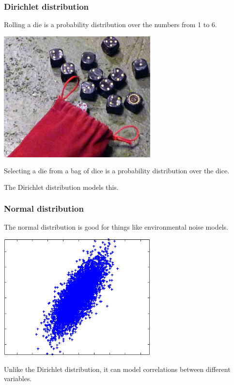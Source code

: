 \begin{frame}
  \frametitle{Dirichlet distribution}
  \begin{center}
    Rolling a die is a probability distribution over the numbers from 1 to 6.

    \includegraphics[width=0.6\textwidth]{img/dice2-cropped.jpg}

    Selecting a die from a bag of dice is a probability distribution over the dice.

    The Dirichlet distribution models this.
  \end{center}
\end{frame}

\begin{frame}
  \frametitle{Normal distribution}
  \begin{center}
    The normal distribution is good for things like environmental noise models.

    \includegraphics[width=0.6\textwidth]{img/normal.png}

    Unlike the Dirichlet distribution, it can model correlations between different variables.
  \end{center}
\end{frame}

